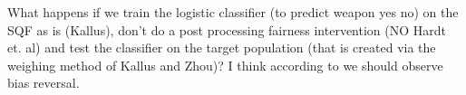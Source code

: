 What happens if we train the logistic classifier (to predict weapon yes no) on the SQF as is (Kallus), don’t do a post processing fairness intervention (NO Hardt et. al)
and test the classifier on the target population (that is created via the weighing method of Kallus and Zhou)? I think according to \cite{RambachanBBOEFW} we should observe bias reversal.